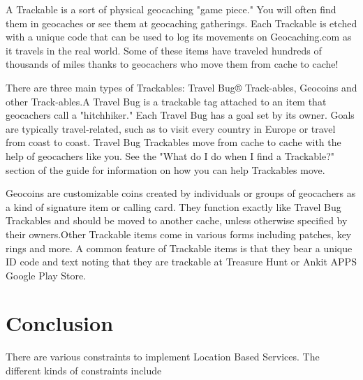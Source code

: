 	A Trackable is a sort of physical geocaching "game piece." You will often find them in geocaches or see them at geocaching gatherings. Each Trackable is etched with a unique code that can be used to log its movements on Geocaching.com as it travels in the real world. Some of these items have traveled hundreds of thousands of miles thanks to geocachers who move them from cache to cache!
	
	There are three main types of Trackables: Travel Bug® Track-ables, Geocoins and other Track-ables.A Travel Bug is a trackable tag attached to an item that geocachers call a "hitchhiker." Each Travel Bug has a goal set by its owner. Goals are typically travel-related, such as to visit every country in Europe or travel from coast to coast. Travel Bug Trackables move from cache to cache with the help of geocachers like you. See the "What do I do when I find a Trackable?" section of the guide for information on how you can help Trackables move.
	
	Geocoins are customizable coins created by individuals or groups of geocachers as a kind of signature item or calling card. They function exactly like Travel Bug Trackables and should be moved to another cache, unless otherwise specified by their owners.Other Trackable items come in various forms including patches, key rings and more. A common feature of Trackable items is that they bear a unique ID code and text noting that they are trackable at Treasure Hunt or Ankit APPS Google Play Store.
	
	
	\section{Conclusion}
	There are various constraints to implement Location Based 
	Services. The different kinds of constraints include 
	
